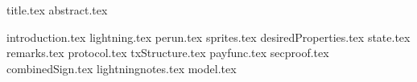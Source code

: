 \documentclass[11pt]{llncs}
\begin{document}
{title.tex}
\thispagestyle{plain}
{abstract.tex}

{introduction.tex}
{lightning.tex}
{perun.tex}
{sprites.tex}
{desiredProperties.tex}
{state.tex}
{remarks.tex}
{protocol.tex}
{txStructure.tex}
{payfunc.tex}
{secproof.tex}
{combinedSign.tex}
{lightningnotes.tex}
{model.tex}

\end{document}
